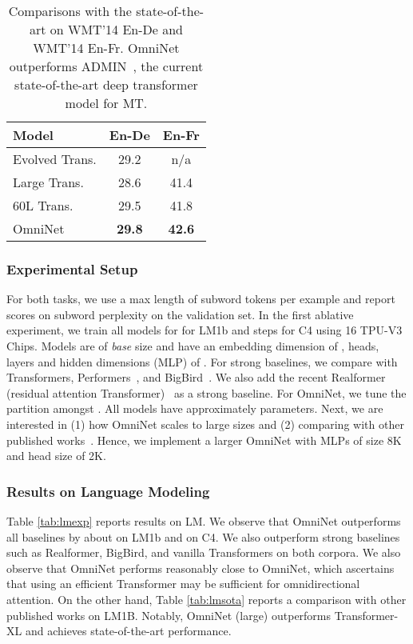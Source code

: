 \documentclass{article}
\begin{document}
\begin{table}[t]
    \vspace{-5pt}
    \centering
    \caption{Comparisons with the state-of-the-art on WMT'14 En-De  and WMT'14 En-Fr. OmniNet outperforms ADMIN~\citep{liu2020very}, the current state-of-the-art deep transformer model for MT.}
    \begin{tabular}{l|cc}
    \toprule
    Model & En-De & En-Fr \\
    \midrule
   Evolved Trans. \citep{so2019evolved}   & 29.2 & n/a \\
      Large Trans. \citep{ott-etal-2018-scaling}  & 28.6 & 41.4  \\
      60L Trans. \citep{liu2020very} & 29.5 & 41.8\\ 
      \midrule
      OmniNet & \textbf{29.8} & \textbf{42.6}\\ 
         \bottomrule
    \end{tabular}
    \label{tab:wmt14}
    \vspace{-22pt}
\end{table}

\subsubsection{Experimental Setup} 
For both tasks, we use a max length of  subword tokens per example and report scores on subword perplexity on the validation set. In the first ablative experiment, we train all models for  for LM1b and  steps for C4 using 16 TPU-V3 Chips. Models are of \textit{base} size and have an embedding dimension of ,  heads,  layers and hidden dimensions (MLP) of . For strong baselines, we compare with Transformers, Performers~\citep{choromanski2020rethinking}, and BigBird~\citep{zaheer2020big}. We also add the recent Realformer (residual attention Transformer)~\citep{he2020realformer} as a strong baseline. For OmniNet, we tune the partition amongst . All models have approximately  parameters. Next, we are interested in (1) how OmniNet scales to large sizes and (2) comparing with other published works~\citep{dai2019transformer}. Hence, we implement a larger OmniNet with MLPs of size 8K and head size of 2K. 
\subsubsection{Results on Language Modeling} 
Table \ref{tab:lmexp} reports results on LM.  We observe that OmniNet outperforms all baselines by about  on LM1b and  on C4. We also outperform strong baselines such as Realformer, BigBird, and vanilla Transformers on both corpora. We also observe that OmniNet performs reasonably close to OmniNet, which ascertains that using an efficient Transformer may be sufficient for omnidirectional attention. On the other hand, Table \ref{tab:lmsota} reports a comparison with other published works on LM1B. Notably, OmniNet (large) outperforms Transformer-XL and achieves state-of-the-art performance. 
\end{document}
